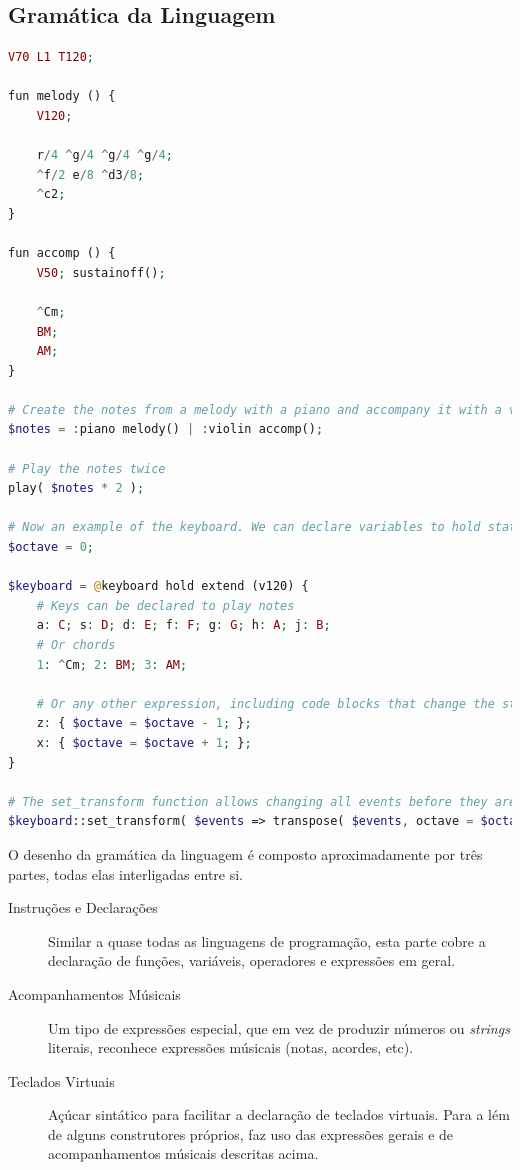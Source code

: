 \documentclass[
  oneside,
  11pt, a4paper,
  footinclude=true,
  headinclude=true,
  cleardoublepage=empty
]{scrbook}
\begin{document}
	\subsection{Gramática da Linguagem}
\begin{lstlisting}[caption=Exemplo da sintaxe proposta da linguagem,language=PHP]
V70 L1 T120;

fun melody () {
    V120;
    
    r/4 ^g/4 ^g/4 ^g/4;
    ^f/2 e/8 ^d3/8; 
    ^c2;
}

fun accomp () {
    V50; sustainoff();

    ^Cm;
    BM; 
    AM;
}

# Create the notes from a melody with a piano and accompany it with a violin in parallel
$notes = :piano melody() | :violin accomp();

# Play the notes twice
play( $notes * 2 );

# Now an example of the keyboard. We can declare variables to hold state
$octave = 0;

$keyboard = @keyboard hold extend (v120) {
    # Keys can be declared to play notes
    a: C; s: D; d: E; f: F; g: G; h: A; j: B;
    # Or chords
    1: ^Cm; 2: BM; 3: AM;
    
    # Or any other expression, including code blocks that change the state
    z: { $octave = $octave - 1; };
    x: { $octave = $octave + 1; };
}

# The set_transform function allows changing all events before they are emitted by this keyboard
$keyboard::set_transform( $events => transpose( $events, octave = $octave ) );
\end{lstlisting}

	
	O desenho da gramática da linguagem é composto aproximadamente por três partes, todas elas interligadas entre si.
	\begin{description}
	 \item[Instruções e Declarações] Similar a quase todas as linguagens de programação, esta parte cobre a declaração de funções, variáveis, operadores e expressões em geral.
	 \item[Acompanhamentos Músicais] Um tipo de expressões especial, que em vez de produzir números ou \textit{strings} literais, reconhece expressões músicais (notas, acordes, etc).
	 \item[Teclados Virtuais] Açúcar sintático para facilitar a declaração de teclados virtuais. Para a lém de alguns construtores próprios, faz uso das expressões gerais e de acompanhamentos músicais descritas acima.
	\end{description}
\end{document}
